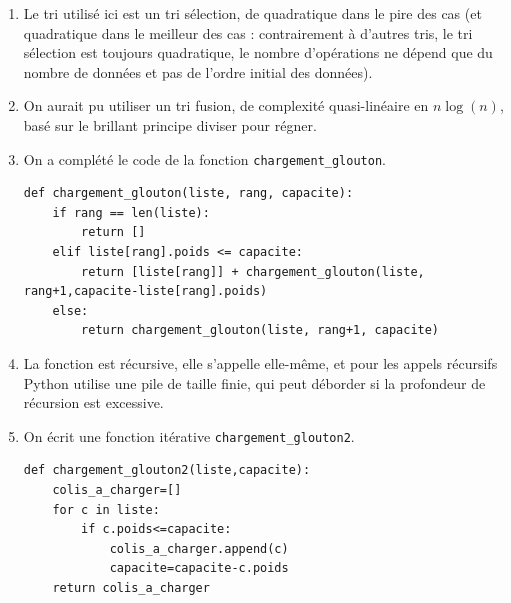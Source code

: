 \documentclass[11pt,a4paper]{article}
\newcommand{\mip}[1]{\texttt{#1}}
\begin{document}
\begin{enumerate}
\smallskip

\textit{ou bien} 

\begin{minipage}[t]{9cm}\begin{verbatim}
def liste_colis_etat(liste,statut):
    return [c for c in liste if c.etat==statut]
\end{verbatim}
\end{minipage}


\item Le tri utilisé ici est un tri sélection, de quadratique dans le pire des cas (et quadratique dans le meilleur des cas : contrairement à d'autres tris, le tri sélection est toujours quadratique, le nombre d'opérations ne dépend que du nombre de données et pas de l'ordre initial des données).

\item On aurait pu utiliser un tri fusion, de complexité quasi-linéaire en $n \log(n)$, basé sur le brillant principe diviser pour régner.%


\newpage

\item On a complété le code de la fonction \mip{chargement_glouton}.

\begin{verbatim}
def chargement_glouton(liste, rang, capacite):
    if rang == len(liste):
        return []
    elif liste[rang].poids <= capacite:
        return [liste[rang]] + chargement_glouton(liste, rang+1,capacite-liste[rang].poids)
    else:
        return chargement_glouton(liste, rang+1, capacite)
\end{verbatim}

\item La fonction est récursive, elle s'appelle elle-même, et pour les appels récursifs Python utilise une pile de taille finie, qui peut déborder si la profondeur de récursion est excessive.

\item On écrit une fonction itérative \mip{chargement_glouton2}.

\begin{verbatim}
def chargement_glouton2(liste,capacite):
    colis_a_charger=[]
    for c in liste:
        if c.poids<=capacite:
            colis_a_charger.append(c)
            capacite=capacite-c.poids
    return colis_a_charger
\end{verbatim}



\end{enumerate}
\bigskip
\end{document}
